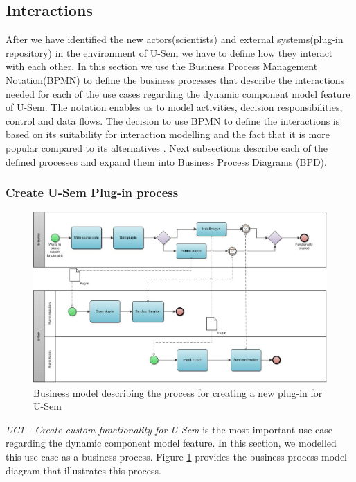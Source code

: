 \subsection{Interactions}

After we have identified the new actors(scientists) and external systems(plug-in repository) in the environment of U-Sem we have to define how they interact with each other. In this section we use the Business Process Management Notation(BPMN) \cite{BPMN} to define the business processes that describe the interactions needed for each of the use cases regarding the dynamic component model feature of U-Sem. The notation enables us to model activities, decision responsibilities, control and data flows. The decision to use BPMN to define the interactions is based on its suitability for interaction modelling and the fact that it is more popular compared to its alternatives \cite{Decker}. Next subsections describe each of the defined processes and expand them into Business Process Diagrams (BPD).

\subsubsection{Create U-Sem Plug-in process}

\begin{figure}[h!]
  \centering
  	\includegraphics[scale=0.7,angle=90]{plug-in/business_processes/CreatePlugInBusinessModel.jpg}
  \caption{Business model describing the process for creating a new plug-in for U-Sem}
  \label{fig_install_bpm}
\end{figure}

\textit{UC1 - Create custom functionality for U-Sem} is the most important use case regarding the dynamic component model feature. In this section, we modelled this use case as a business process. Figure \ref{fig_install_bpm} provides the business process model diagram that illustrates this process. 

